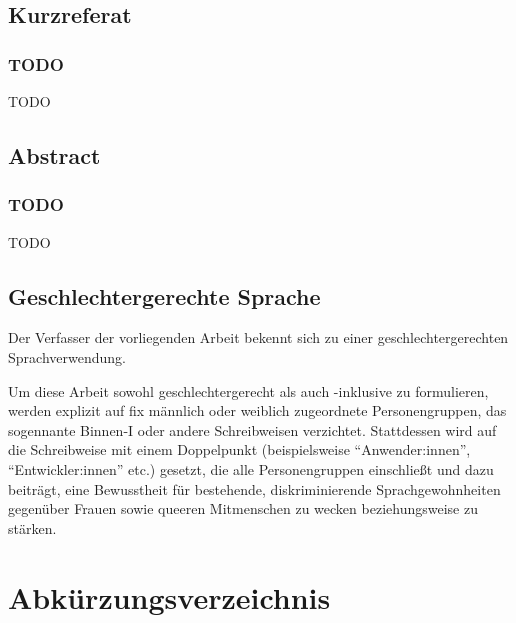\documentclass[a4paper,12pt,twoside]{scrreprt}
\begin{document}
\newpage
\section*{Kurzreferat}
\label{sec:kurzreferat}

\subsection*{TODO}

TODO

\newpage
\section*{Abstract}
\label{sec:abstract}

\subsection*{TODO}

TODO

\newpage
\section*{Geschlechtergerechte Sprache}
\label{sec:gendern}

Der Verfasser der vorliegenden Arbeit bekennt sich zu einer geschlechtergerechten Sprachverwendung.

Um diese Arbeit sowohl geschlechtergerecht als auch -inklusive zu formulieren, werden explizit auf fix männlich oder weiblich zugeordnete Personengruppen, das sogennante Binnen-I oder andere Schreibweisen verzichtet. Stattdessen wird auf die Schreibweise mit einem Doppelpunkt (beispielsweise \enquote{Anwender:innen}, \enquote{Entwickler:innen} etc.) gesetzt, die alle Personengruppen einschließt und dazu beiträgt, eine Bewusstheit für bestehende, diskriminierende Sprachgewohnheiten gegenüber Frauen sowie queeren Mitmenschen zu wecken beziehungsweise zu stärken.

\cleardoublepage %
\setcounter{tocdepth}{2}
\tableofcontents

\clearpage
{}
{}
\listoffigures

\clearpage
{}
{}
\chapter*{Abkürzungsverzeichnis}
\begin{acronym}
\end{acronym}
\end{document}
